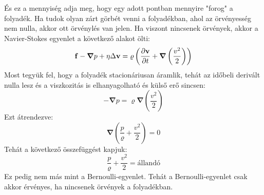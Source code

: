 \documentclass[../main.tex]{subfiles}
\begin{document}
És ez a mennyiség adja meg, hogy egy adott pontban mennyire "forog" a folyadék. Ha tudok olyan zárt görbét venni a folyadékban, ahol az örvényesség nem nulla,
akkor ott örvénylés van jelen. Ha viszont nincsenek örvények, akkor a Navier-Stokes egyenlet a következő alakot ölti:
\begin{equation}
    \bold{f} - \boldsymbol{\nabla} p + \eta \Delta \bold{v} = \varrho \left(\frac{\partial \bold{v}}{\partial t} + \boldsymbol{\nabla} \left(\frac{v^2}{2}\right)\right)
\end{equation}
Most tegyük fel, hogy a folyadék stacionáriusan áramlik, tehát az időbeli derivált nulla lesz és a viszkozitás is elhanyagolható és külső erő sincsen:
\begin{equation}
    - \boldsymbol{\nabla} p = \varrho \boldsymbol{\nabla} \left(\frac{v^2}{2}\right)
\end{equation}
Ezt átrendezve:
\begin{equation}
    \boldsymbol{\nabla} \left(\frac{p}{\varrho} + \frac{v^2}{2}\right) = 0
\end{equation}
Tehát a következő összefüggést kapjuk:
\begin{equation}
    \frac{p}{\varrho} + \frac{v^2}{2} = \text{állandó}
\end{equation}
Ez pedig nem más mint a Bernoulli-egyenlet. Tehát a Bernoulli-egyenlet csak akkor érvényes, ha nincsenek örvények a folyadékban.
\end{document}
